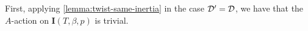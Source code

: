 First, applying \cref{lemma:twist-same-inertia} in the case $\mathcal{D}' = \mathcal{D}$, we have that the $A$-action on $\mathbf{I}(T, \beta, p)$ is trivial.


